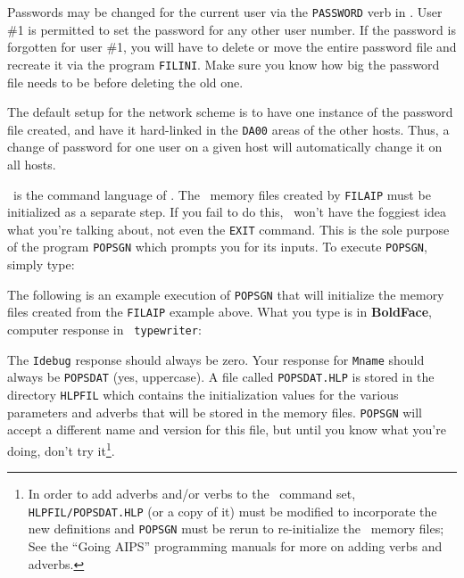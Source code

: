 Passwords may be changed for the current user via the {\tt PASSWORD} verb
in \AIPS.  User \#1 is permitted to set the password for any other user
number.  If the password is forgotten for user \#1, you will have to
delete or move the entire password file and recreate it via the program
{\tt FILINI}.  Make sure you know how big the password file needs to be
before deleting the old one.

The default setup for the network scheme is to have one instance of
the password file created, and have it hard-linked in the {\tt\dol DA00}
areas of the other hosts.  Thus, a change of password for one user on
a given host will automatically change it on all hosts.
\medskip


\POPS\ is the command language of \AIPS.  The \POPS\ memory files
created by {\tt FILAIP} must be initialized as a
separate step.  If you fail to do this, \AIPS\ won't have the foggiest
idea what you're talking about, not even the {\tt EXIT} command.  This
is the sole purpose of the program {\tt POPSGN} which prompts you for
its inputs.  To execute {\tt POPSGN}, simply type:
\medskip


\medskip\noindent
The following is an example execution of {\tt POPSGN} that will
initialize the memory files created from the {\tt FILAIP} example above.
What you type is in {\bf BoldFace}, computer response in {\tt
typewriter}:
\medskip

\example{\ }

\medskip\noindent
The {\tt Idebug} response should always be zero.  Your response for
{\tt Mname} should always be {\tt POPSDAT} (yes, uppercase).  A file
called {\tt POPSDAT.HLP} is stored in the directory {\tt\dol HLPFIL}
which contains the initialization values for the various parameters
and adverbs that will be stored in the memory files.  {\tt POPSGN}
will accept a different name and version for this file, but until you
know what you're doing, don't try it\footnote*{\eightpoint In order
        to add  adverbs and/or verbs to the \AIPS\ command set,
        {\tt\dol HLPFIL/POPSDAT.HLP} (or a copy of it) must be modified to
        incorporate the new definitions and {\tt POPSGN} must be rerun
        to re-initialize the \POPS\ memory files; See the ``Going AIPS''
        programming manuals for more on adding verbs and adverbs.}.

